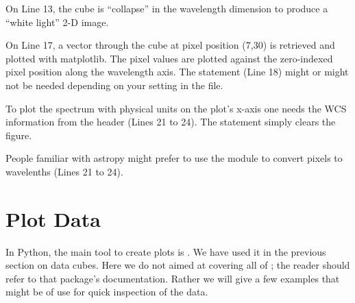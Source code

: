 \documentclass[letterpaper,10pt,english]{sphinxmanual}
\begin{document}
On Line 13, the cube is ``collapse'' in the wavelength dimension to produce a
``white light'' 2-D image.

On Line 17, a vector through the cube at pixel position (7,30) is retrieved
and plotted with matplotlib.  The pixel values are plotted against the
zero-indexed pixel position along the wavelength axis.  The 
statement (Line 18) might or might not be needed depending on your
 setting in the  file.

To plot the spectrum with physical units on the plot's x-axis one needs the
WCS information from the header (Lines 21 to 24).  The statement 
simply clears the figure.

People familiar with astropy might prefer to use the  module to
convert pixels to wavelenths (Lines 21 to 24).


\section{Plot Data}
\label{data:plot-data}
In Python, the main tool to create plots is .  We have used it
in the previous section on data cubes.  Here we do not aimed at covering all
of ; the reader should refer to that package's documentation.
Rather we will give a few examples that might be of use for quick inspection
of the data.
\end{document}
